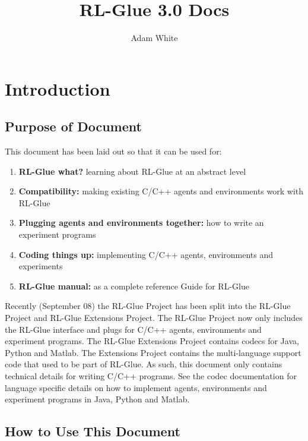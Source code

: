 \documentclass[11pt]{article}
\title{RL-Glue 3.0 Docs}
\author{Adam White}
\begin{document}
\maketitle
\tableofcontents


\section{Introduction}
\subsection{Purpose of Document}
This document has been laid out so that it can be used for: 
\begin{enumerate}
\item  {\bf RL-Glue what?} learning about RL-Glue at an abstract level
\item {\bf Compatibility:} making existing C/C++ agents and environments work with RL-Glue
\item {\bf Plugging agents and environments together:} how to write an experiment programs
\item {\bf Coding things up:} implementing C/C++ agents, environments and experiments
\item {\bf RL-Glue manual:} as a complete reference Guide for RL-Glue  
\end{enumerate}

Recently (September 08) the RL-Glue Project has been split into the RL-Glue Project and RL-Glue Extensions Project. The RL-Glue Project now only includes the RL-Glue interface and plugs for C/C++ agents, environments and experiment programs. The RL-Glue Extensions Project contains codecs for Java, Python and Matlab. The Extensions Project contains the multi-language support code that used to be part of RL-Glue. As such, this document only contains technical details for writing C/C++ programs. See the codec documentation for language specific details on how to implement agents, environments and experiment programs in Java, Python and Matlab.
 
\subsection{How to Use This Document}
\end{document}
